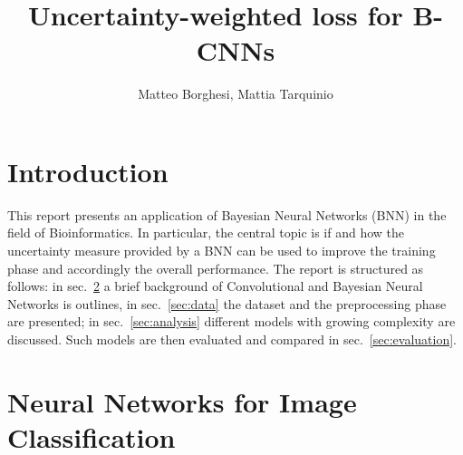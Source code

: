 \documentclass[11pt,twoside,a4paper]{article}
\begin{document}
\title{Uncertainty-weighted loss for B-CNNs}
\author{Matteo Borghesi, Mattia Tarquinio}
\maketitle

\section{Introduction}
This report presents an application of Bayesian Neural Networks (BNN) in the field of Bioinformatics. In particular, the central topic is if and how the uncertainty measure provided by a BNN can be used to improve the training phase and accordingly the overall performance.\newline
The report is structured as follows: in sec.~\ref{sec:NN} a brief background of Convolutional and Bayesian Neural Networks is outlines, in sec.~\ref{sec:data} the dataset and the preprocessing phase are presented; in sec.~\ref{sec:analysis} different models with growing complexity are discussed. Such models are then evaluated and compared in sec.~\ref{sec:evaluation}.

\section{Neural Networks for Image Classification}
\label{sec:NN}
\end{document}
